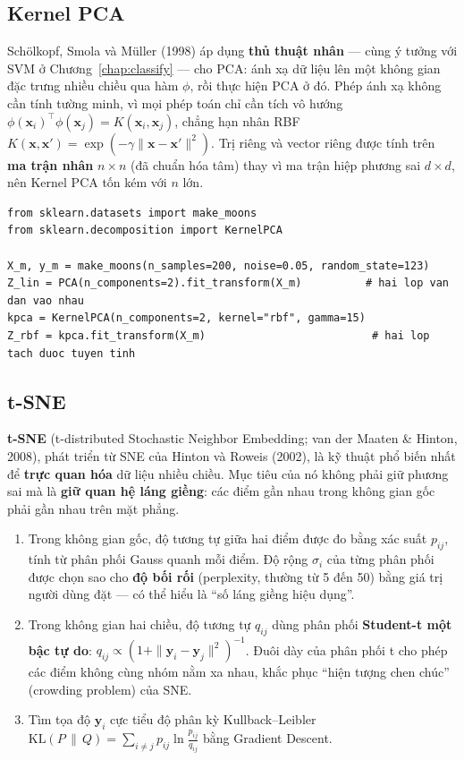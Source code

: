 \subsection{Kernel PCA}

Schölkopf, Smola và Müller (1998) áp dụng \textbf{thủ thuật nhân} --- cùng ý tưởng với SVM ở Chương~\ref{chap:classify} --- cho PCA: ánh xạ dữ liệu lên một không gian đặc trưng nhiều chiều qua hàm $\phi$, rồi thực hiện PCA ở đó. Phép ánh xạ không cần tính tường minh, vì mọi phép toán chỉ cần tích vô hướng $\phi(\mathbf{x}_i)^\top\phi(\mathbf{x}_j) = K(\mathbf{x}_i, \mathbf{x}_j)$, chẳng hạn nhân RBF $K(\mathbf{x}, \mathbf{x}') = \exp(-\gamma\|\mathbf{x} - \mathbf{x}'\|^2)$. Trị riêng và vector riêng được tính trên \textbf{ma trận nhân} $n \times n$ (đã chuẩn hóa tâm) thay vì ma trận hiệp phương sai $d \times d$, nên Kernel PCA tốn kém với $n$ lớn.

\begin{lstlisting}[caption={Kernel PCA "trải phẳng" hai nửa mặt trăng}]
from sklearn.datasets import make_moons
from sklearn.decomposition import KernelPCA

X_m, y_m = make_moons(n_samples=200, noise=0.05, random_state=123)
Z_lin = PCA(n_components=2).fit_transform(X_m)          # hai lop van dan vao nhau
kpca = KernelPCA(n_components=2, kernel="rbf", gamma=15)
Z_rbf = kpca.fit_transform(X_m)                          # hai lop tach duoc tuyen tinh
\end{lstlisting}

\subsection{t-SNE}

\textbf{t-SNE} (t-distributed Stochastic Neighbor Embedding; van der Maaten \& Hinton, 2008), phát triển từ SNE của Hinton và Roweis (2002), là kỹ thuật phổ biến nhất để \textbf{trực quan hóa} dữ liệu nhiều chiều. Mục tiêu của nó không phải giữ phương sai mà là \textbf{giữ quan hệ láng giềng}: các điểm gần nhau trong không gian gốc phải gần nhau trên mặt phẳng.
\begin{enumerate}
    \item Trong không gian gốc, độ tương tự giữa hai điểm được đo bằng xác suất $p_{ij}$, tính từ phân phối Gauss quanh mỗi điểm. Độ rộng $\sigma_i$ của từng phân phối được chọn sao cho \textbf{độ bối rối} (perplexity, thường từ 5 đến 50) bằng giá trị người dùng đặt --- có thể hiểu là ``số láng giềng hiệu dụng''.
    \item Trong không gian hai chiều, độ tương tự $q_{ij}$ dùng phân phối \textbf{Student-t một bậc tự do}: $q_{ij} \propto (1 + \|\mathbf{y}_i - \mathbf{y}_j\|^2)^{-1}$. Đuôi dày của phân phối t cho phép các điểm không cùng nhóm nằm xa nhau, khắc phục ``hiện tượng chen chúc'' (crowding problem) của SNE.
    \item Tìm tọa độ $\mathbf{y}_i$ cực tiểu độ phân kỳ Kullback--Leibler $\mathrm{KL}(P\,\|\,Q) = \sum_{i \neq j} p_{ij}\ln\frac{p_{ij}}{q_{ij}}$ bằng Gradient Descent.
\end{enumerate}

